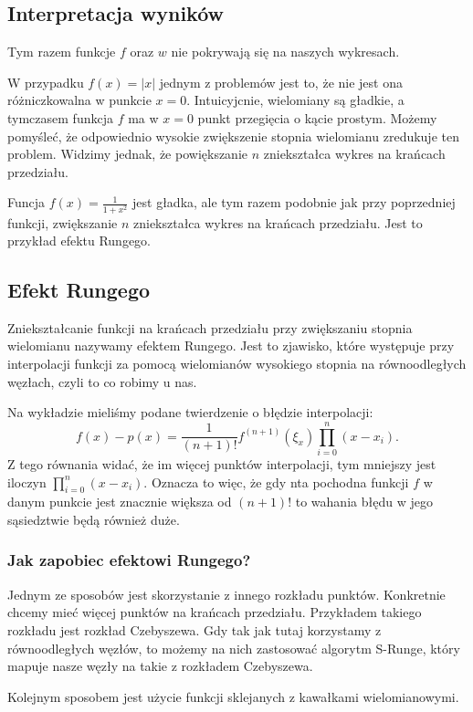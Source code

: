 \documentclass{article}
\begin{document}
\subsection*{Interpretacja wyników}
Tym razem funkcje $f$ oraz $w$ nie pokrywają się na naszych wykresach.

W przypadku $f(x) = |x|$ jednym z problemów jest to, że nie jest ona
różniczkowalna w punkcie $x=0$. Intuicyjcnie, wielomiany są gładkie, a tymczasem
funkcja $f$ ma w $x=0$ punkt przegięcia o kącie prostym. Możemy pomyśleć, że odpowiednio
wysokie zwiększenie stopnia wielomianu zredukuje ten problem. Widzimy jednak, że
powiększanie $n$ zniekształca wykres na krańcach przedziału.

Funcja $f(x) = \frac{1}{1+x^2}$ jest gładka, ale tym razem podobnie jak przy poprzedniej
funkcji, zwiększanie $n$ zniekształca wykres na krańcach przedziału. Jest to przykład
efektu Rungego.

\subsection*{Efekt Rungego}
Zniekształcanie funkcji na krańcach przedziału przy zwiększaniu stopnia wielomianu
nazywamy efektem Rungego. Jest to zjawisko, które występuje przy interpolacji
funkcji za pomocą wielomianów wysokiego stopnia na równoodległych węzłach,
czyli to co robimy u nas.

Na wykładzie mieliśmy podane twierdzenie o błędzie interpolacji:
\[
f(x) - p(x) = \frac{1}{(n + 1)!} f^{(n+1)}(\xi_{x}) \prod_{i=0}^{n} (x - x_i).
\]
Z tego równania widać, że im więcej punktów interpolacji, tym mniejszy jest iloczyn
$\prod_{i=0}^{n} (x - x_i)$. Oznacza to więc, że gdy nta pochodna funkcji $f$ w danym
punkcie jest znacznie większa od $(n+1)!$ to wahania błędu w jego sąsiedztwie będą
również duże.

\subsubsection*{Jak zapobiec efektowi Rungego?}
Jednym ze sposobów jest skorzystanie z innego rozkładu punktów. Konkretnie chcemy
mieć więcej punktów na krańcach przedziału. Przykładem takiego rozkładu jest
rozkład Czebyszewa. Gdy tak jak tutaj korzystamy z równoodległych węzłów, to
możemy na nich zastosować algorytm S-Runge, który mapuje nasze węzły na
takie z rozkładem Czebyszewa.

Kolejnym sposobem jest użycie funkcji sklejanych z kawałkami wielomianowymi.
\end{document}
